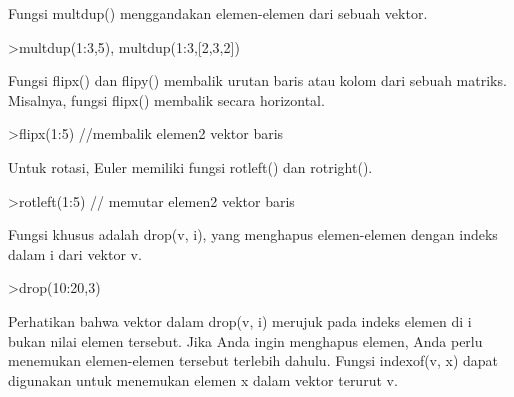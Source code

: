 \documentclass[a4paper,10pt]{article}
\begin{document}
\begin{eulernotebook}
\begin{eulercomment}
\begin{eulercomment}
\begin{eulercomment}
\begin{eulercomment}
\begin{eulercomment}
\begin{eulercomment}
\begin{eulercomment}
\begin{eulercomment}
\begin{eulercomment}
\begin{eulercomment}
\begin{eulercomment}
\begin{eulercomment}
\begin{eulercomment}
\begin{eulercomment}
\begin{eulercomment}
\begin{eulercomment}
\begin{eulercomment}
\begin{eulercomment}
\begin{euleroutput}
  [1,  2,  3,  1,  2,  3,  1,  2,  3,  1,  2,  3,  1,  2,  3]
\end{euleroutput}
\begin{eulercomment}
Fungsi multdup() menggandakan elemen-elemen dari sebuah vektor.
\end{eulercomment}
\begin{eulerprompt}
>multdup(1:3,5), multdup(1:3,[2,3,2])
\end{eulerprompt}
\begin{euleroutput}
  [1,  1,  1,  1,  1,  2,  2,  2,  2,  2,  3,  3,  3,  3,  3]
  [1,  1,  2,  2,  2,  3,  3]
\end{euleroutput}
\begin{eulercomment}
Fungsi flipx() dan flipy() membalik urutan baris atau kolom dari
sebuah matriks. Misalnya, fungsi flipx() membalik secara horizontal.
\end{eulercomment}
\begin{eulerprompt}
>flipx(1:5) //membalik elemen2 vektor baris
\end{eulerprompt}
\begin{euleroutput}
  [5,  4,  3,  2,  1]
\end{euleroutput}
\begin{eulercomment}
Untuk rotasi, Euler memiliki fungsi rotleft() dan rotright().
\end{eulercomment}
\begin{eulerprompt}
>rotleft(1:5) // memutar elemen2 vektor baris
\end{eulerprompt}
\begin{euleroutput}
  [2,  3,  4,  5,  1]
\end{euleroutput}
\begin{eulercomment}
Fungsi khusus adalah drop(v, i), yang menghapus elemen-elemen dengan
indeks dalam i dari vektor v.
\end{eulercomment}
\begin{eulerprompt}
>drop(10:20,3)
\end{eulerprompt}
\begin{euleroutput}
  [10,  11,  13,  14,  15,  16,  17,  18,  19,  20]
\end{euleroutput}
\begin{eulercomment}
Perhatikan bahwa vektor dalam drop(v, i) merujuk pada indeks elemen di
i bukan nilai elemen tersebut. Jika Anda ingin menghapus elemen, Anda
perlu menemukan elemen-elemen tersebut terlebih dahulu. Fungsi
indexof(v, x) dapat digunakan untuk menemukan elemen x dalam vektor
terurut v.

\end{eulercomment}
\end{eulercomment}
\end{eulercomment}
\end{eulercomment}
\end{eulercomment}
\end{eulercomment}
\end{eulercomment}
\end{eulercomment}
\end{eulercomment}
\end{eulercomment}
\end{eulercomment}
\end{eulercomment}
\end{eulercomment}
\end{eulercomment}
\end{eulercomment}
\end{eulercomment}
\end{eulercomment}
\end{eulercomment}
\end{eulercomment}
\end{eulernotebook}
\end{document}
